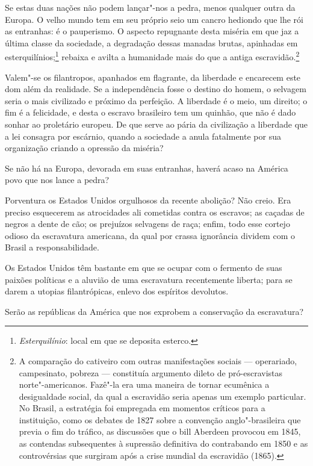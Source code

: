 \begin{linenumbers}
 Se estas duas nações não podem lançar"-nos a pedra, menos qualquer
outra da Europa. O velho mundo tem em seu próprio seio um cancro
hediondo que lhe rói as entranhas: é o pauperismo. O aspecto repugnante
desta miséria em que jaz a última classe da sociedade, a degradação
dessas manadas brutas, apinhadas em
esterquilínios;\footnote{ \textit{Esterquilínio}: local em que se deposita esterco.} 
rebaixa e avilta a humanidade mais do que a antiga
escravidão.\footnote{ A comparação do cativeiro com outras manifestações sociais --- 
operariado, campesinato, pobreza --- constituía argumento dileto de pró-escravistas norte"-americanos. 
Fazê"-la era uma maneira de tornar ecumênica a desigualdade social, da qual a escravidão seria apenas 
um exemplo particular. No Brasil, a estratégia foi empregada em momentos críticos para a instituição, 
como os debates de 1827 sobre a convenção anglo"-brasileira que previa o fim do tráfico, as discussões 
que o bill Aberdeen provocou em 1845, as contendas subsequentes à supressão definitiva do contrabando 
em 1850 e as controvérsias que surgiram após a crise mundial da escravidão (1865).} 

 Valem"-se os filantropos, apanhados em flagrante, da liberdade e
encarecem este dom além da realidade. Se a independência fosse o
destino do homem, o selvagem seria o mais civilizado e próximo da
perfeição. A liberdade é o meio, um direito; o fim é a felicidade, e
desta o escravo brasileiro tem um quinhão, que não é dado sonhar ao
proletário europeu. De que serve ao pária da civilização a liberdade
que a lei consagra por escárnio, quando a sociedade a anula fatalmente
por sua organização criando a opressão da miséria? 

 Se não há na Europa, devorada em suas entranhas, haverá acaso na
América povo que nos lance a pedra?

 Porventura os Estados Unidos orgulhosos da recente abolição? Não creio.
Era preciso esquecerem as atrocidades ali cometidas contra os escravos;
as caçadas de negros a dente de cão; os prejuízos selvagens de raça;
enfim, todo esse cortejo odioso da escravatura americana, da qual por
crassa ignorância dividem com o Brasil a responsabilidade. 

 Os Estados Unidos têm bastante em que se ocupar com o fermento de suas
paixões políticas e a aluvião de uma escravatura recentemente liberta;
para se darem a utopias filantrópicas, enlevo dos espíritos devolutos. 

 Serão as repúblicas da América que nos exprobem a conservação da escravatura? 


\end{linenumbers}
